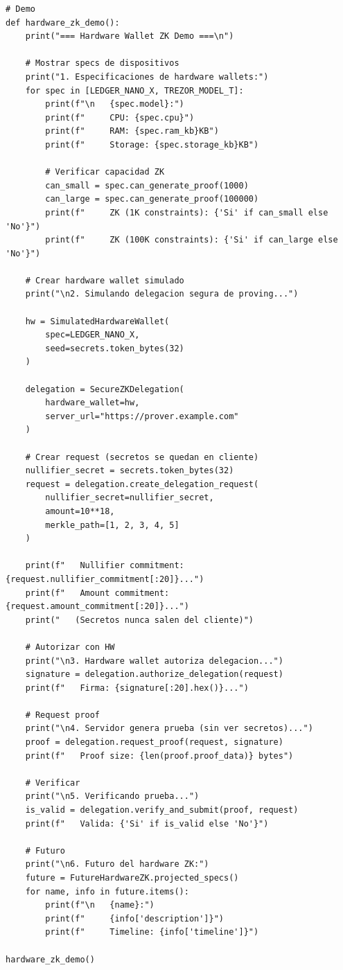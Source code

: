 \documentclass[11pt,a4paper,twoside]{book}
\theoremstyle{definition}
\theoremstyle{remark}
\begin{document}
\begin{lstlisting}[style=python, caption={Integración de hardware wallet con ZK}]
# Demo
def hardware_zk_demo():
    print("=== Hardware Wallet ZK Demo ===\n")
    
    # Mostrar specs de dispositivos
    print("1. Especificaciones de hardware wallets:")
    for spec in [LEDGER_NANO_X, TREZOR_MODEL_T]:
        print(f"\n   {spec.model}:")
        print(f"     CPU: {spec.cpu}")
        print(f"     RAM: {spec.ram_kb}KB")
        print(f"     Storage: {spec.storage_kb}KB")
        
        # Verificar capacidad ZK
        can_small = spec.can_generate_proof(1000)
        can_large = spec.can_generate_proof(100000)
        print(f"     ZK (1K constraints): {'Si' if can_small else 'No'}")
        print(f"     ZK (100K constraints): {'Si' if can_large else 'No'}")
    
    # Crear hardware wallet simulado
    print("\n2. Simulando delegacion segura de proving...")
    
    hw = SimulatedHardwareWallet(
        spec=LEDGER_NANO_X,
        seed=secrets.token_bytes(32)
    )
    
    delegation = SecureZKDelegation(
        hardware_wallet=hw,
        server_url="https://prover.example.com"
    )
    
    # Crear request (secretos se quedan en cliente)
    nullifier_secret = secrets.token_bytes(32)
    request = delegation.create_delegation_request(
        nullifier_secret=nullifier_secret,
        amount=10**18,
        merkle_path=[1, 2, 3, 4, 5]
    )
    
    print(f"   Nullifier commitment: {request.nullifier_commitment[:20]}...")
    print(f"   Amount commitment: {request.amount_commitment[:20]}...")
    print("   (Secretos nunca salen del cliente)")
    
    # Autorizar con HW
    print("\n3. Hardware wallet autoriza delegacion...")
    signature = delegation.authorize_delegation(request)
    print(f"   Firma: {signature[:20].hex()}...")
    
    # Request proof
    print("\n4. Servidor genera prueba (sin ver secretos)...")
    proof = delegation.request_proof(request, signature)
    print(f"   Proof size: {len(proof.proof_data)} bytes")
    
    # Verificar
    print("\n5. Verificando prueba...")
    is_valid = delegation.verify_and_submit(proof, request)
    print(f"   Valida: {'Si' if is_valid else 'No'}")
    
    # Futuro
    print("\n6. Futuro del hardware ZK:")
    future = FutureHardwareZK.projected_specs()
    for name, info in future.items():
        print(f"\n   {name}:")
        print(f"     {info['description']}")
        print(f"     Timeline: {info['timeline']}")

hardware_zk_demo()
\end{lstlisting}
\end{document}
